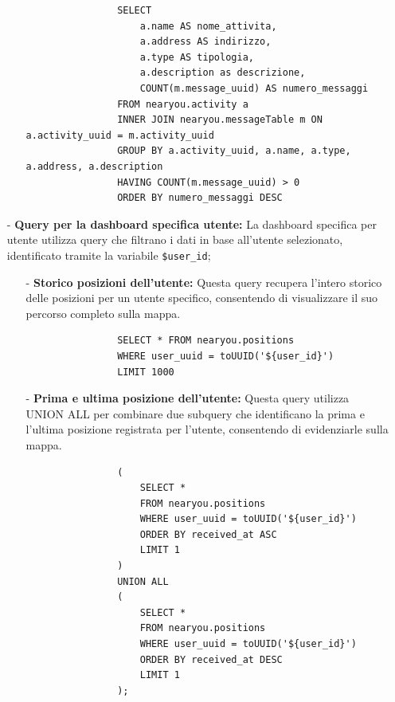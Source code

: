 \documentclass[10pt]{article}
\begin{document}
\begin{itemize}
\begin{itemize}
                \begin{lstlisting}
                SELECT 
                    a.name AS nome_attivita,
                    a.address AS indirizzo,
                    a.type AS tipologia,
                    a.description as descrizione, 
                    COUNT(m.message_uuid) AS numero_messaggi
                FROM nearyou.activity a
                INNER JOIN nearyou.messageTable m ON a.activity_uuid = m.activity_uuid
                GROUP BY a.activity_uuid, a.name, a.type, a.address, a.description
                HAVING COUNT(m.message_uuid) > 0
                ORDER BY numero_messaggi DESC
                \end{lstlisting}
            \end{itemize}

        \item[-] \textbf{Query per la dashboard specifica utente:} 
        La dashboard specifica per utente utilizza query che filtrano i dati in base all'utente selezionato, identificato tramite la variabile \texttt{\${user\_id}};

            \begin{itemize}
                \item[-] \textbf{Storico posizioni dell'utente:}
                Questa query recupera l'intero storico delle posizioni per un utente specifico, consentendo di visualizzare il suo percorso completo sulla mappa.
                
                \begin{lstlisting}
                SELECT * FROM nearyou.positions 
                WHERE user_uuid = toUUID('${user_id}') 
                LIMIT 1000
                \end{lstlisting}
                
                \item[-] \textbf{Prima e ultima posizione dell'utente:}
                Questa query utilizza UNION ALL per combinare due subquery che identificano la prima e l'ultima posizione registrata per l'utente, consentendo di evidenziarle sulla mappa.
                
                \begin{lstlisting}
                (
                    SELECT * 
                    FROM nearyou.positions 
                    WHERE user_uuid = toUUID('${user_id}') 
                    ORDER BY received_at ASC 
                    LIMIT 1
                )
                UNION ALL
                (
                    SELECT * 
                    FROM nearyou.positions 
                    WHERE user_uuid = toUUID('${user_id}') 
                    ORDER BY received_at DESC 
                    LIMIT 1
                );
                \end{lstlisting}
                

\end{itemize}
\end{itemize}
\end{document}
